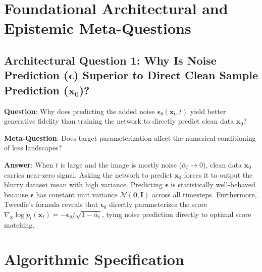 \documentclass[11pt,a4paper]{article}
\theoremstyle{definition}
\begin{document}
\section{Foundational Architectural and Epistemic Meta-Questions}

\subsection{Architectural Question 1: Why Is Noise Prediction ($\boldsymbol{\epsilon}$) Superior to Direct Clean Sample Prediction ($\mathbf{x}_0$)?}
\textbf{Question}: Why does predicting the added noise $\boldsymbol{\epsilon}_\theta(\mathbf{x}_t, t)$ yield better generative fidelity than training the network to directly predict clean data $\mathbf{x}_0$?

\textbf{Meta-Question}: Does target parameterization affect the numerical conditioning of loss landscapes?

\textbf{Answer}: When $t$ is large and the image is mostly noise ($\bar{\alpha}_t \to 0$), clean data $\mathbf{x}_0$ carries near-zero signal. Asking the network to predict $\mathbf{x}_0$ forces it to output the blurry dataset mean with high variance. Predicting $\boldsymbol{\epsilon}$ is statistically well-behaved because $\boldsymbol{\epsilon}$ has constant unit variance $\mathcal{N}(\mathbf{0}, \mathbf{I})$ across all timesteps. Furthermore, Tweedie's formula reveals that $\boldsymbol{\epsilon}_\theta$ directly parameterizes the score $\nabla_{\mathbf{x}} \log p_t(\mathbf{x}_t) = -\boldsymbol{\epsilon}_\theta / \sqrt{1 - \bar{\alpha}_t}$, tying noise prediction directly to optimal score matching.

\section{Algorithmic Specification}
\end{document}

